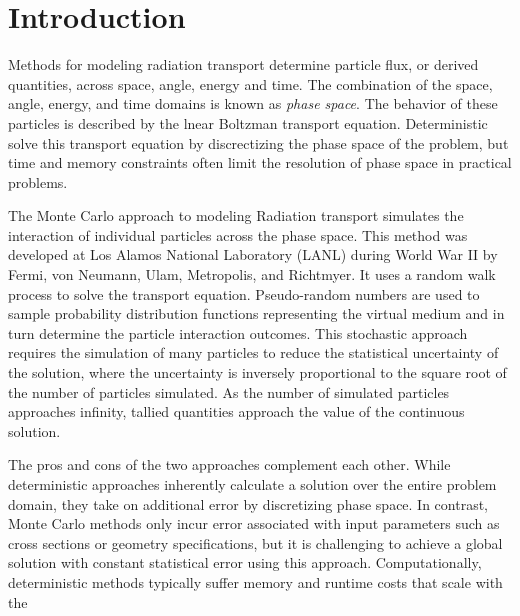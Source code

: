
\chapter{Introduction}\label{ch:introduction}


Methods for modeling radiation transport determine particle flux, or derived
quantities, across space, angle, energy and time. The combination of the space,
angle, energy, and time domains is known as \textit{phase space}. The behavior
of these particles is described by the lnear Boltzman transport
equation\cite{Ulam_1949}. Deterministic solve this transport equation by discrectizing
the phase space of the problem, but time and memory constraints often limit the
resolution of phase space in practical problems.

The Monte Carlo approach to modeling Radiation transport simulates the
interaction of individual particles across the phase space\cite{Lewis_1993}. This method was
developed at Los Alamos National Laboratory (LANL) during World War II by Fermi,
von Neumann, Ulam, Metropolis, and Richtmyer\cite{LANL_1987}. It uses a random walk process to
solve the transport equation. Pseudo-random numbers are used to sample
probability distribution functions representing the virtual medium and in turn
determine the particle interaction outcomes. This stochastic approach requires
the simulation of many particles to reduce the statistical uncertainty of the
solution, where the uncertainty is inversely proportional to the square root of
the number of particles simulated. As the number of simulated particles
approaches infinity, tallied quantities approach the value of the continuous
solution.

The pros and cons of the two approaches complement each other. While
deterministic approaches inherently calculate a solution over the entire problem
domain, they take on additional error by discretizing phase space. In contrast,
Monte Carlo methods only incur error associated with input parameters such as
cross sections or geometry specifications, but it is challenging to achieve a
global solution with constant statistical error using this
approach. Computationally, deterministic methods typically suffer memory and
runtime costs that scale with the 


